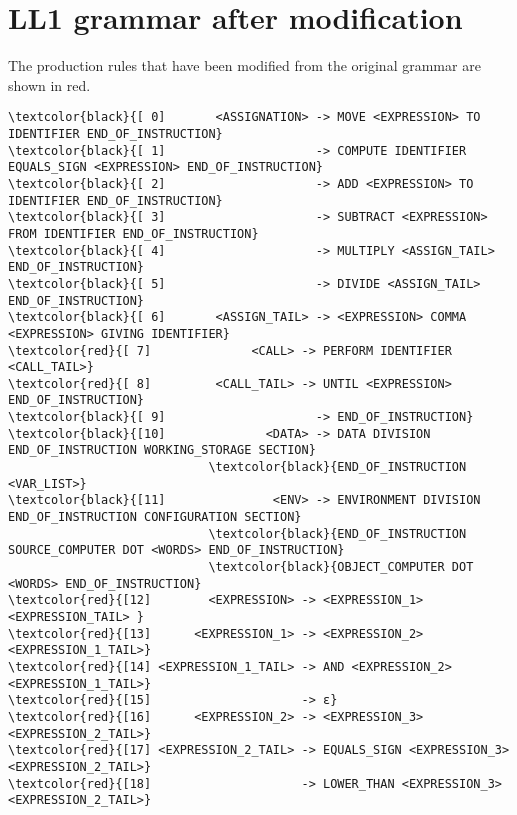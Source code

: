 \newpage\cleardoublepage{}
\section{LL1 grammar after modification}
\label{app:grammar}

The production rules that have been modified from the original grammar are shown in red.

\vspace{5mm}
\begingroup
\fontsize{8pt}{10pt}\selectfont
\begin{Verbatim}[commandchars=\\\{\}]
\textcolor{black}{[ 0]       <ASSIGNATION> -> MOVE <EXPRESSION> TO IDENTIFIER END_OF_INSTRUCTION}
\textcolor{black}{[ 1]                     -> COMPUTE IDENTIFIER EQUALS_SIGN <EXPRESSION> END_OF_INSTRUCTION}
\textcolor{black}{[ 2]                     -> ADD <EXPRESSION> TO IDENTIFIER END_OF_INSTRUCTION}
\textcolor{black}{[ 3]                     -> SUBTRACT <EXPRESSION> FROM IDENTIFIER END_OF_INSTRUCTION}
\textcolor{black}{[ 4]                     -> MULTIPLY <ASSIGN_TAIL> END_OF_INSTRUCTION}
\textcolor{black}{[ 5]                     -> DIVIDE <ASSIGN_TAIL> END_OF_INSTRUCTION}
\textcolor{black}{[ 6]       <ASSIGN_TAIL> -> <EXPRESSION> COMMA <EXPRESSION> GIVING IDENTIFIER}
\textcolor{red}{[ 7]              <CALL> -> PERFORM IDENTIFIER <CALL_TAIL>}
\textcolor{red}{[ 8]         <CALL_TAIL> -> UNTIL <EXPRESSION> END_OF_INSTRUCTION}
\textcolor{black}{[ 9]                     -> END_OF_INSTRUCTION}
\textcolor{black}{[10]              <DATA> -> DATA DIVISION END_OF_INSTRUCTION WORKING_STORAGE SECTION}
                            \textcolor{black}{END_OF_INSTRUCTION <VAR_LIST>}
\textcolor{black}{[11]               <ENV> -> ENVIRONMENT DIVISION END_OF_INSTRUCTION CONFIGURATION SECTION}
                            \textcolor{black}{END_OF_INSTRUCTION SOURCE_COMPUTER DOT <WORDS> END_OF_INSTRUCTION}
                            \textcolor{black}{OBJECT_COMPUTER DOT <WORDS> END_OF_INSTRUCTION}
\textcolor{red}{[12]        <EXPRESSION> -> <EXPRESSION_1> <EXPRESSION_TAIL> }
\textcolor{red}{[13]      <EXPRESSION_1> -> <EXPRESSION_2> <EXPRESSION_1_TAIL>}
\textcolor{red}{[14] <EXPRESSION_1_TAIL> -> AND <EXPRESSION_2> <EXPRESSION_1_TAIL>}
\textcolor{red}{[15]                     -> ε}
\textcolor{red}{[16]      <EXPRESSION_2> -> <EXPRESSION_3> <EXPRESSION_2_TAIL>}
\textcolor{red}{[17] <EXPRESSION_2_TAIL> -> EQUALS_SIGN <EXPRESSION_3> <EXPRESSION_2_TAIL>}
\textcolor{red}{[18]                     -> LOWER_THAN <EXPRESSION_3> <EXPRESSION_2_TAIL>}

\end{Verbatim}
